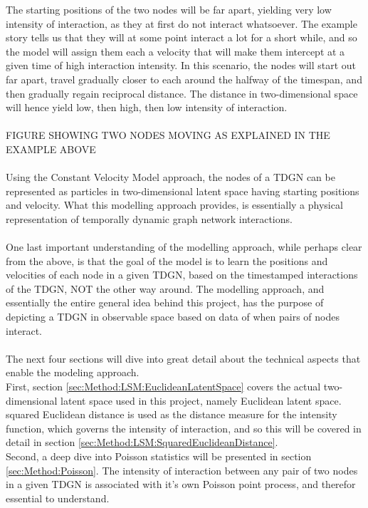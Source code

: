 The starting positions of the two nodes will be far apart, yielding very low intensity of interaction, as they at first do not interact whatsoever.
The example story tells us that they will at some point interact a lot for a short while, and so the model will assign them each a velocity that will make them intercept at a given time of high interaction intensity. 
In this scenario, the nodes will start out far apart, travel gradually closer to each around the halfway of the timespan, and then gradually regain reciprocal distance.
The distance in two-dimensional space will hence yield low, then high, then low intensity of interaction.
\\\\
FIGURE SHOWING TWO NODES MOVING AS EXPLAINED IN THE EXAMPLE ABOVE
\\\\
Using the Constant Velocity Model approach, the nodes of a TDGN can be represented as particles in two-dimensional latent space having starting positions and velocity. 
What this modelling approach provides, is essentially a physical representation of temporally dynamic graph network interactions.
\\\\
One last important understanding of the modelling approach, while perhaps clear from the above, is that the goal of the model is to learn the positions and velocities of each node in a given TDGN, based on the timestamped interactions of the TDGN, NOT the other way around. 
The modelling approach, and essentially the entire general idea behind this project, has the purpose of depicting a TDGN in observable space based on data of when pairs of nodes interact.
\\\\
The next four sections will dive into great detail about the technical aspects that enable the modeling approach.
\\
First, section \ref{sec:Method:LSM:EuclideanLatentSpace} covers the actual two-dimensional latent space used in this project, namely Euclidean latent space. 
squared Euclidean distance is used as the distance measure for the intensity function, which governs the intensity of interaction, and so this will be covered in detail in section \ref{sec:Method:LSM:SquaredEuclideanDistance}.
\\
Second, a deep dive into Poisson statistics will be presented in section \ref{sec:Method:Poisson}.
The intensity of interaction between any pair of two nodes in a given TDGN is associated with it's own Poisson point process, and therefor essential to understand.

